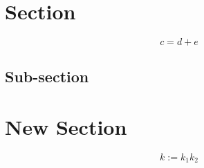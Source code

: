 \setcounter{equation}{0}
\renewcommand{\theequation}{\Alph{section}\arabic{equation}}

%
\renewcommand{\thesection}{Appendix~\Alph{section}}
\renewcommand{\thefigure}{\Alph{figure}}
%

\setcounter{section}{0}

\section{Section}

\begin{equation}
    c = d + e
    \label{Eqn2}
\end{equation}
%
\subsection{Sub-section}
\label{AppASub}

\section{New Section}

\begin{equation}
    k := k_1 k_2
    \label{EqnD}
\end{equation}


